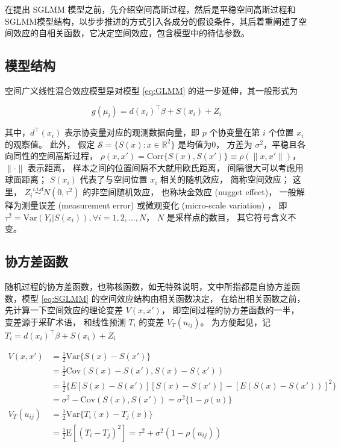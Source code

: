 \documentclass[12pt,a4paper,UTF8,twoside]{book}
\theoremstyle{definition}
\theoremstyle{definition}
\theoremstyle{definition}
\theoremstyle{remark}
\begin{document}
在提出 SGLMM
模型之前，先介绍空间高斯过程，然后是平稳空间高斯过程和SGLMM模型结构，以步步推进的方式引入各成分的假设条件，其后着重阐述了空间效应的自相关函数，它决定空间效应，包含模型中的待估参数。

\hypertarget{intro-sglmm}{%
\subsection{模型结构}\label{intro-sglmm}}

空间广义线性混合效应模型是对模型 \eqref{eq:GLMM}
的进一步延伸，其一般形式为

\begin{equation}
g(\mu_i) = d(x_i)^{\top}\beta + S(x_i) + Z_i \label{eq:SGLMM}
\end{equation}

\noindent 其中，\(d^{\top}(x_i)\) 表示协变量对应的观测数据向量，即 \(p\)
个协变量在第 \(i\) 个位置 \(x_i\) 的观察值。 此外， 假定
\(\mathcal{S} = \{S(x): x \in \mathbb{R}^2\}\) 是均值为0， 方差为
\(\sigma^2\)，平稳且各向同性的空间高斯过程，
\(\rho(x,x') = \mathrm{Corr}\{S(x),S(x')\} \equiv \rho(\|x,x'\|)\)，
\(\|\cdot\|\) 表示距离， 样本之间的位置间隔不大就用欧氏距离，
间隔很大可以考虑用球面距离； \(S(x_i)\) 代表了与空间位置 \(x_i\)
相关的随机效应， 简称空间效应； 这里，
\(Z_i \stackrel{i.i.d}{\sim} N(0,\tau^2)\) 的非空间随机效应，
也称块金效应 (nugget effect)， 一般解释为测量误差 (measurement error)
或微观变化 (micro-scale variation) \citep{Christensen2004}， 即
\(\tau^2=\mathrm{Var}(Y_{i}|S(x_{i})),\forall i = 1,2, \ldots, N\)，
\(N\) 是采样点的数目， 其它符号含义不变。

\hypertarget{covariance-function}{%
\subsection{协方差函数}\label{covariance-function}}

随机过程的协方差函数，也称核函数，如无特殊说明，文中所指都是自协方差函数，模型
\eqref{eq:SGLMM} 的空间效应结构由相关函数决定， 在给出相关函数之前，
先计算一下空间效应的理论变差 \(V(x,x')\)，
即空间过程的协方差函数的一半， 变差源于采矿术语， 和线性预测 \(T_{i}\)
的变差 \(V_{T}(u_{ij})\)。 为方便起见，记
\(T_{i} = d(x_i)^{\top}\beta + S(x_i) + Z_i\)

\begin{equation}
\begin{aligned}
V(x,x') 
&= \frac{1}{2}\mathrm{Var}\{S(x)-S(x')\}\\
&= \frac{1}{2}\mathrm{Cov}(S(x)-S(x'),S(x)-S(x'))\\
&= \frac{1}{2}\{E[S(x)-S(x')][S(x)-S(x')]-[E(S(x)-S(x'))]^2\}\\
&= \sigma^2-\mathrm{Cov}(S(x),S(x'))=\sigma^2\{1-\rho(u)\}\\
V_{T}(u_{ij})
&= \frac{1}{2}\mathrm{Var}\{T_{i}(x)-T_{j}(x)\} \\
&= \frac{1}{2}\mathrm{E}[(T_{i}-T_{j})^2]=\tau^2+\sigma^2(1-\rho(u_{ij})) 
\end{aligned} \label{eq:variograms}
\end{equation}
\end{document}
